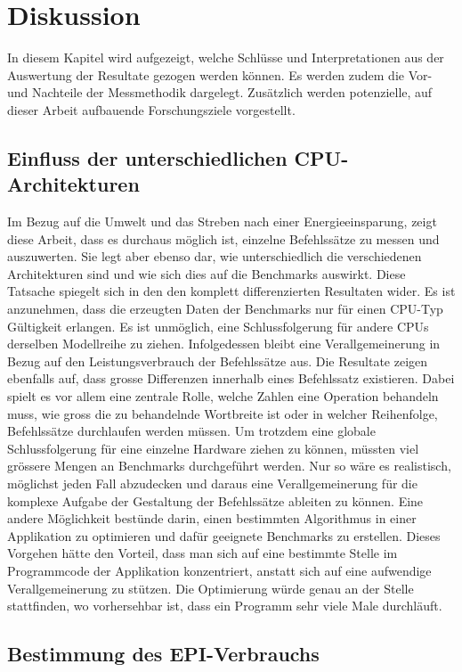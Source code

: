 \chapter{Diskussion}

In diesem Kapitel wird aufgezeigt, welche Schlüsse und Interpretationen aus der Auswertung der Resultate gezogen werden können. Es werden zudem die Vor- und Nachteile der Messmethodik dargelegt. Zusätzlich werden potenzielle, auf dieser Arbeit aufbauende Forschungsziele vorgestellt.

\section{Einfluss der unterschiedlichen CPU-Architekturen}
Im Bezug auf die Umwelt und das Streben nach einer Energieeinsparung, zeigt diese Arbeit, dass es durchaus möglich ist, einzelne Befehlssätze zu messen und auszuwerten. Sie legt aber ebenso dar, wie unterschiedlich die verschiedenen Architekturen sind und wie sich dies auf die Benchmarks auswirkt.  Diese Tatsache spiegelt sich in den den komplett differenzierten Resultaten wider. Es ist anzunehmen, dass die erzeugten Daten der Benchmarks nur für einen CPU-Typ Gültigkeit erlangen. Es ist unmöglich, eine Schlussfolgerung für andere CPUs derselben Modellreihe zu ziehen. Infolgedessen bleibt eine Verallgemeinerung in Bezug auf den Leistungsverbrauch der Befehlssätze aus. Die Resultate zeigen ebenfalls auf, dass grosse Differenzen innerhalb eines Befehlssatz existieren. Dabei spielt es vor allem eine zentrale Rolle, welche Zahlen eine Operation behandeln muss, wie gross die zu behandelnde Wortbreite ist oder in welcher Reihenfolge, Befehlssätze durchlaufen werden müssen. Um trotzdem eine globale Schlussfolgerung für eine einzelne Hardware ziehen zu können, müssten viel grössere Mengen an Benchmarks durchgeführt werden. Nur so wäre es realistisch, möglichst jeden Fall abzudecken und daraus eine Verallgemeinerung für die komplexe Aufgabe der Gestaltung der Befehlssätze ableiten zu können. Eine andere Möglichkeit bestünde darin, einen bestimmten Algorithmus in einer Applikation zu optimieren und dafür geeignete Benchmarks zu erstellen. Dieses Vorgehen hätte den Vorteil, dass man sich auf eine bestimmte Stelle im Programmcode der Applikation konzentriert, anstatt sich auf eine aufwendige Verallgemeinerung zu stützen. Die Optimierung würde genau an der Stelle stattfinden, wo vorhersehbar ist, dass ein Programm sehr viele Male durchläuft.

\section{Bestimmung des EPI-Verbrauchs}
\label{sec:bestimmung_grundenergie}


